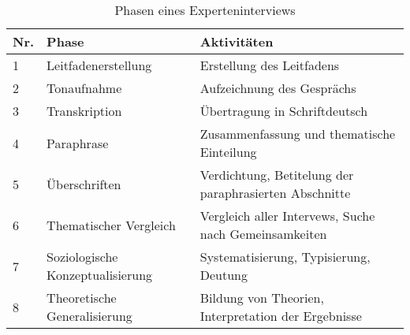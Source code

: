 \begin{table}[ht]
\centering
\begin{tabularx}{1\textwidth}{llX}%
Nr. & Phase                            & Aktivitäten \\\midrule
1   & Leitfadenerstellung              & Erstellung des Leitfadens\\
2   & Tonaufnahme                      & Aufzeichnung des Gesprächs\\
3   & Transkription                    & Übertragung in Schriftdeutsch\\
4   & Paraphrase                       & Zusammenfassung und thematische Einteilung\\
5   & Überschriften                    & Verdichtung, Betitelung der paraphrasierten Abschnitte\\
6   & Thematischer Vergleich           & Vergleich aller Intervews, Suche nach Gemeinsamkeiten\\
7   & Soziologische Konzeptualisierung & Systematisierung, Typisierung, Deutung \\
8   & Theoretische Generalisierung     & Bildung von Theorien, Interpretation der Ergebnisse
\end{tabularx}
  \\
\caption{Phasen eines Experteninterviews}
\label{tab:phasenei}
\end{table}

%
%

